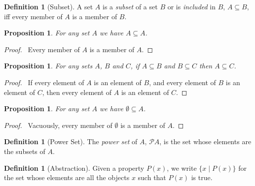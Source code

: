 \documentclass{article}
\let\qed\relax
\newtheorem{proposition}[axiom]{Proposition}
\theoremstyle{definition}
\newtheorem{definition}[axiom]{Definition}
\begin{document}
    \begin{definition}[Subset]
        A set $A$ is a \emph{subset} of a set $B$ or is \emph{included} in $B$, $A \subseteq B$, iff every
        member of $A$ is a member of $B$.
    \end{definition}

    \begin{proposition}
        For any set $A$ we have $A \subseteq A$.
    \end{proposition}

    \begin{proof}
        \pf\ Every member of $A$ is a member of $A$. \qed
    \end{proof}

    \begin{proposition}
        For any sets $A$, $B$ and $C$, if $A \subseteq B$ and $B \subseteq C$ then $A \subseteq C$.
    \end{proposition}

    \begin{proof}
        \pf\ If every element of $A$ is an element of $B$, and every element of $B$ is an element of $C$,
        then every element of $A$ is an element of $C$. \qed
    \end{proof}
    
    \begin{proposition}
        For any set $A$ we have $\emptyset \subseteq A$.
    \end{proposition}

    \begin{proof}
        \pf\ Vacuously, every member of $\emptyset$ is a member of $A$. \qed
    \end{proof}

    \begin{definition}[Power Set]
        The \emph{power set} of $A$, $\mathcal{P} A$, is the set whose elements are the subsets of $A$.
    \end{definition}

    \begin{definition}[Abstraction]
        Given a property $P(x)$, we write $\{ x \mid P(x) \}$ for the set whose elements are all the objects
        $x$ such that $P(x)$ is true.
    \end{definition}
\end{document}
